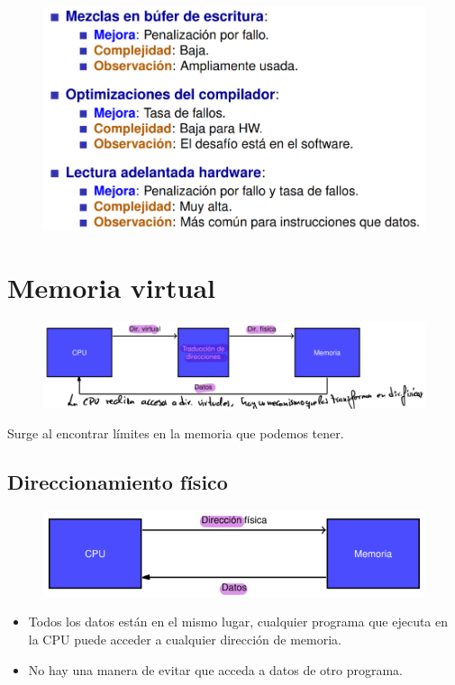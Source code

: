 \documentclass[12pt, twoside, openright]{report} %
\begin{document}
  \begin{figure}[H]
    {\includegraphics[scale=.3]{Untitled 25.png}}
  \end{figure}


\section{Memoria virtual}
\begin{figure}[H]
	{\includegraphics[scale=.4]{Untitled 26.png}}
\end{figure}


    Surge al encontrar límites en la memoria que podemos tener.

  \subsection{Direccionamiento físico}
  \begin{figure}[H]
    {\includegraphics[scale=.4]{Untitled 27.png}}
  \end{figure}
  \begin{itemize}
    \item Todos los datos están en el mismo lugar, cualquier programa que ejecuta en la CPU puede acceder a cualquier dirección de memoria.
    \item
    No hay una manera de evitar que acceda a datos de otro programa.
  \end{itemize}
\end{document}
